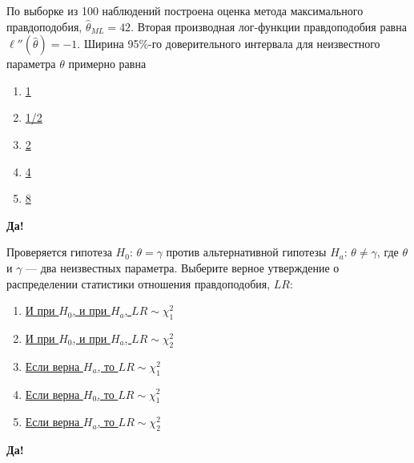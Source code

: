 \documentclass[t]{beamer}
\begin{document}
 \begin{frame} \label{37-Yes} 
\begin{block}{37} 

По выборке из 100 наблюдений построена оценка метода максимального правдоподобия, $\hat \theta_{ML} = 42$. Вторая производная лог-функции правдоподобия равна $\ell''(\hat\theta) = -1$. Ширина 95\%-го доверительного интервала для неизвестного параметра $\theta$ примерно равна
  


 \end{block} 
\begin{enumerate} 
\item[] \hyperlink{37-No}{\beamergotobutton{} 1}
\item[] \hyperlink{37-No}{\beamergotobutton{} 1/2}
\item[] \hyperlink{37-No}{\beamergotobutton{} 2}
\item[] \hyperlink{37-Yes}{\beamergotobutton{} 4}
\item[] \hyperlink{37-No}{\beamergotobutton{} 8}
\end{enumerate} 

 \textbf{Да!} 
 \hyperlink{38}{}\end{frame} 


 \begin{frame} \label{38-Yes} 
\begin{block}{38} 

  Проверяется гипотеза $H_0$: $\theta = \gamma$ против альтернативной гипотезы $H_a$: $\theta \neq \gamma$, где $\theta$ и $\gamma$ — два неизвестных параметра. Выберите верное утверждение о распределении статистики отношения правдоподобия, $LR$:

  


 \end{block} 
\begin{enumerate} 
\item[] \hyperlink{38-No}{\beamergotobutton{} И при $H_0$, и при $H_a$, $LR \sim \chi_1^2$}
\item[] \hyperlink{38-No}{\beamergotobutton{} И при $H_0$, и при $H_a$, $LR \sim \chi_2^2$}
\item[] \hyperlink{38-No}{\beamergotobutton{} Если верна $H_a$, то $LR \sim \chi_1^2$}
\item[] \hyperlink{38-Yes}{\beamergotobutton{} Если верна $H_0$, то $LR \sim \chi_1^2$}
\item[] \hyperlink{38-No}{\beamergotobutton{} Если верна $H_a$, то $LR \sim \chi_2^2$}
\end{enumerate} 

 \textbf{Да!} 
 \hyperlink{39}{}\end{frame} 
\end{document}
